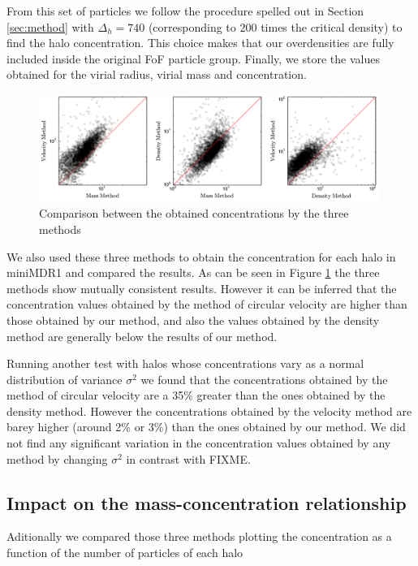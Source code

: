 \documentclass[useAMS,usenatbib]{mn2e}
\begin{document}
From this set of particles we follow the procedure spelled out in
Section \ref{sec:method} with $\Delta_h=740$  (corresponding to $200$
times the critical density) to find the halo concentration. 
This choice makes that our overdensities are fully included inside the
original FoF particle group.
Finally, we store the values obtained for the virial radius, virial
mass and concentration. 


\begin{figure}
\begin{center}
  \includegraphics[width=0.99\textwidth]{mass-density-velocity.pdf}
\end{center}
\caption{Comparison between the obtained concentrations by the three methods
    \label{fig:mdv}}
\end{figure}

We also used these three methods to obtain the concentration for each
halo in miniMDR1 and compared the results. As can be seen in Figure
\ref{fig:mdv} the three methods show mutually consistent
results. However it can be inferred that the concentration values
​​obtained by the method of circular velocity are higher than those
obtained by our method, and also the values ​​obtained by the density
method are generally below the results of our method. 

Running another test with halos whose concentrations vary as a normal
distribution of variance ${\sigma}^2$ we found that the concentrations
obtained by the method of circular velocity are a 35\% greater than
the ones obtained by the density method. However the concentrations
obtained by the velocity method are barey higher (around 2\% or 3\%)
than the ones obtained by our method. We did not find any significant
variation in the concentration values obtained by any method by
changing ${\sigma}^2$ in contrast with FIXME.




\subsection{Impact on the mass-concentration relationship}
Aditionally we compared those three methods plotting the concentration as a function of the number of particles of each halo
\end{document}
